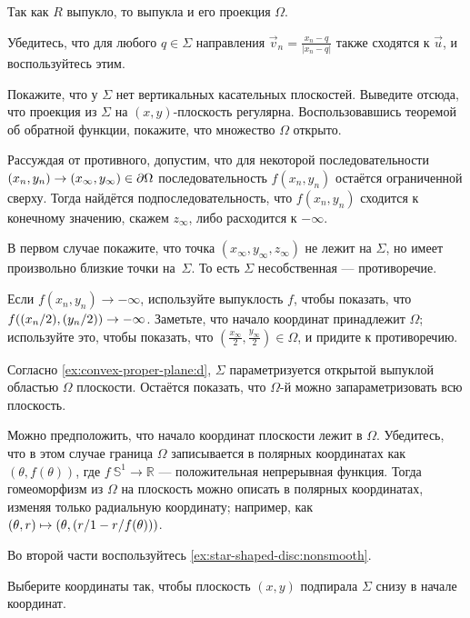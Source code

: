 Так как $R$ выпукло, то выпукла и его проекция $\Omega$.

Убедитесь, что для любого $q\in \Sigma$ направления $\vec v_n=\tfrac{x_n-q}{|x_n-q|}$ также сходятся к $\vec u$, и воспользуйтесь этим.

Покажите, что у $\Sigma$ нет вертикальных касательных плоскостей.
Выведите отсюда, что проекция из $\Sigma$ на $(x,y)$-плоскость регулярна.
Воспользовавшись теоремой об обратной функции, покажите, что множество $\Omega$ открыто.

Рассуждая от противного, допустим, что для некоторой последовательности $(x_n,y_n)\z\to(x_\infty,y_\infty)\in \partial\Omega$ последовательность $f(x_n,y_n)$ остаётся ограниченной сверху.
Тогда найдётся подпоследовательность, что $f(x_n,y_n)$ сходится к конечному значению, скажем $z_\infty$, либо расходится к $-\infty$.

В первом случае покажите, что точка $(x_\infty, y_\infty,z_\infty)$ не лежит на $\Sigma$, но имеет произвольно близкие точки на~$\Sigma$.
То есть $\Sigma$ несобственная --- противоречие.

Если $f(x_n,y_n)\to -\infty$, используйте выпуклость $f$, чтобы показать, что $f(\tfrac{x_n}2 ,\tfrac{y_n}2)\z\to -\infty$.
Заметьте, что начало координат принадлежит $\Omega$;
используйте это, чтобы показать, что $(\tfrac{x_\infty}2, \tfrac{y_\infty}2)\in\Omega$,
и придите к противоречию.

Согласно \ref{ex:convex-proper-plane:d}, $\Sigma$ параметризуется открытой выпуклой областью $\Omega$ плоскости.
Остаётся показать, что $\Omega$-й можно запараметризовать всю плоскость.

Можно предположить, что начало координат плоскости лежит в $\Omega$.
Убедитесь, что в этом случае граница $\Omega$ записывается в полярных координатах как $(\theta,f(\theta))$, где $f\:\mathbb{S}^1\to\mathbb{R}$ --- положительная непрерывная функция.
Тогда гомеоморфизм из $\Omega$ на плоскость можно описать в полярных координатах, изменяя только радиальную координату;
например, как 
$(\theta,r)\z\mapsto (\theta,
\tfrac{r}{1-r/f(\theta)})$.

Во второй части воспользуйтесь \ref{ex:star-shaped-disc:nonsmooth}.

Выберите координаты так, чтобы плоскость $(x,y)$ подпирала $\Sigma$ снизу в начале координат.


